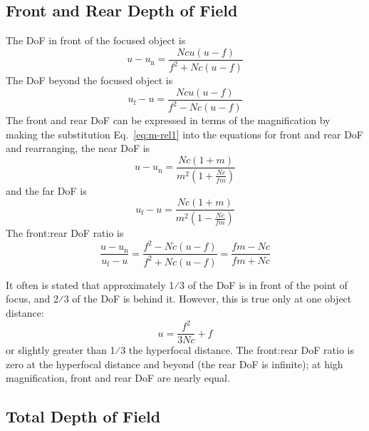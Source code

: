 \documentclass[11pt, oneside]{scrartcl}   	%
\begin{document}
\subsection{Front and Rear Depth of Field}

The DoF in front of the focused object is
\begin{equation}
   u-u_\mathrm{n} = \frac{N\!cu(u-f)}{f^2 +N\!c(u-f)}
   \label{eq:17}
\end{equation}
The DoF beyond the focused object is
\begin{equation}
u_\mathrm{f} - u = \frac{N\!cu(u-f)}{f^2 - N\!c(u-f)}
\end{equation}
The front and rear DoF can be expressed in terms of the magnification by making the substitution Eq.~\ref{eq:m-rel1}
into the equations for front and rear DoF and rearranging, the near DoF is
\begin{equation}
   u-u_\mathrm{n} = \frac{N\!c(1+m)}{m^2\left(1+\frac{N\!c}{fm}\right)}
   \label{eq:19}
\end{equation}
and the far DoF is
\begin{equation}
u_\mathrm{f} - u = \frac{N\!c(1+m)}{m^2\left(1-\frac{N\!c}{fm}\right)}
   \label{eq:20}
\end{equation}
The front:rear DoF ratio is
\begin{equation}
   \frac{u-u_\mathrm{n}}{u_\mathrm{f}-u}=\frac{f^2-N\!c(u-f)}{f^2+N\!c(u-f)} = \frac{fm-N\!c}{fm+N\!c}
   \label{eq:frrat}
\end{equation}

It often is stated that approximately 1⁄3 of the DoF is in front of the point of focus, and 2⁄3 of
the DoF is behind it. However, this is true only at one object distance: 
\begin{equation}
u=\frac{f^2}{3N\!c} + f
\end{equation}
or slightly greater than 1⁄3 the hyperfocal distance. The front:rear DoF ratio is zero at the hyperfocal distance and beyond (the rear DoF is infinite); at high magnification, front and rear DoF are nearly equal.

\subsection{Total Depth of Field}
\end{document}
